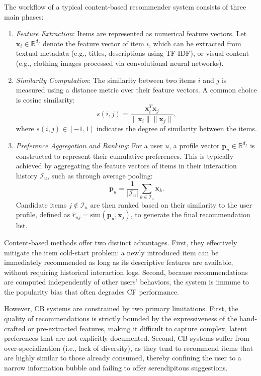 The workflow of a typical content-based recommender system consists of three main phases:
\begin{enumerate}
    \item \textit{Feature Extraction}: Items are represented as numerical feature vectors. Let \(\mathbf{x}_i \in \mathbb{R}^{d_f}\) denote the feature vector of item \(i\), which can be extracted from textual metadata (e.g., titles, descriptions using TF-IDF), or visual content (e.g., clothing images processed via convolutional neural networks).
    \item \textit{Similarity Computation}: The similarity between two items \(i\) and \(j\) is measured using a distance metric over their feature vectors. A common choice is cosine similarity:
    \begin{equation}
        s(i, j) = \frac{\mathbf{x}_i^{T} \mathbf{x}_j}{\|\mathbf{x}_i\| \|\mathbf{x}_j\|},
    \end{equation}
    where \(s(i, j) \in [-1, 1]\) indicates the degree of similarity between the items.
    \item \textit{Preference Aggregation and Ranking}: For a user \(u\), a profile vector \(\mathbf{p}_u \in \mathbb{R}^{d_f}\) is constructed to represent their cumulative preferences. This is typically achieved by aggregating the feature vectors of items in their interaction history \(\mathcal{I}_u\), such as through average pooling:
    \begin{equation}
        \mathbf{p}_u = \frac{1}{|\mathcal{I}_u|} \sum_{k \in \mathcal{I}_u} \mathbf{x}_k.
    \end{equation}
    Candidate items \(j \notin \mathcal{I}_u\) are then ranked based on their similarity to the user profile, defined as \(\hat{r}_{uj} = \text{sim}(\mathbf{p}_u, \mathbf{x}_j)\), to generate the final recommendation list.
\end{enumerate}

Content-based methods offer two distinct advantages. First, they effectively mitigate the item cold-start problem: a newly introduced item can be immediately recommended as long as its descriptive features are available, without requiring historical interaction logs. Second, because recommendations are computed independently of other users' behaviors, the system is immune to the popularity bias that often degrades CF performance.

However, CB systems are constrained by two primary limitations. First, the quality of recommendations is strictly bounded by the expressiveness of the hand-crafted or pre-extracted features, making it difficult to capture complex, latent preferences that are not explicitly documented. Second, CB systems suffer from over-specialization (i.e., lack of diversity), as they tend to recommend items that are highly similar to those already consumed, thereby confining the user to a narrow information bubble and failing to offer serendipitous suggestions.


